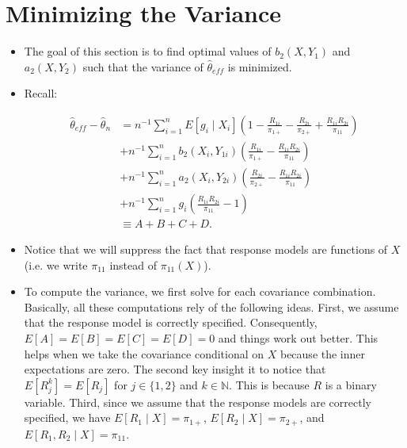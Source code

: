 \documentclass[12pt]{article}
\begin{document}
\newpage

\section*{Minimizing the Variance}

\begin{itemize}
  \item The goal of this section is to find optimal values of $b_2(X, Y_1)$ and
    $a_2(X, Y_2)$ such that the variance of $\hat \theta_{eff}$ is minimized.

  \item Recall:

    \begin{align*}
      \hat \theta_{eff} - \hat \theta_n 
      &= n^{-1} \sum_{i = 1}^n E[g_i \mid X_i] \left(1 - \frac{R_{1i}}{\pi_{1+}}
      - \frac{R_{2i}}{\pi_{2+}} + \frac{R_{1i}R_{2i}}{\pi_{11}}\right) \\
      &+ n^{-1} \sum_{i = 1}^n b_2(X_i, Y_{1i}) \left(\frac{R_{1i}}{\pi_{1+}} -
      \frac{R_{1i}R_{2i}}{\pi_{11}}\right)\\
      &+ n^{-1} \sum_{i = 1}^n a_2(X_i, Y_{2i}) \left(\frac{R_{2i}}{\pi_{2+}} -
      \frac{R_{1i}R_{2i}}{\pi_{11}}\right)\\
      &+ n^{-1} \sum_{i = 1}^n g_i \left(\frac{R_{1i}R_{2i}}{\pi_{11}} -
      1\right) \\
      &\equiv A + B + C + D.
    \end{align*}

  \item Notice that we will suppress the fact that response models are functions
    of $X$ (i.e. we write $\pi_{11}$ instead of $\pi_{11}(X)$).
  
  \item To compute the variance, we first solve for each covariance combination.
    Basically, all these computations rely of the following ideas. First, we
    assume that the response model is correctly specified. Consequently,
    $E[A] = E[B] = E[C] = E[D] = 0$ and things work out better. This helps when
    we take the covariance conditional on $X$ because the inner expectations are
    zero. The second key insight it to notice that $E[R_{j}^k] = E[R_j]$ for $j
    \in \{1, 2\}$ and $k \in \mathbb{N}$. This is because $R$ is a binary
    variable. Third, since we assume that the response models are correctly
    specified, we have $E[R_1 \mid X] = \pi_{1+}$, $E[R_2 \mid X] = \pi_{2+}$,
    and $E[R_1, R_2 \mid X] = \pi_{11}$.


\end{itemize}
\end{document}
